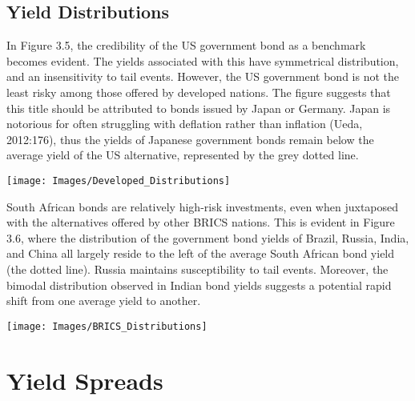 \documentclass[11pt,preprint, authoryear]{elsarticle}
\let\origfigure\figure
\let\endorigfigure\endfigure
\renewenvironment{figure}[1][2] {
    \expandafter\origfigure\expandafter[H]
} {
    \endorigfigure
}
\numberwithin{equation}{section}
\numberwithin{figure}{section}
\numberwithin{table}{section}
\begin{document}
\hypertarget{yield-distributions}{%
\subsection{Yield Distributions}\label{yield-distributions}}

In Figure 3.5, the credibility of the US government bond as a benchmark
becomes evident. The yields associated with this have symmetrical
distribution, and an insensitivity to tail events. However, the US
government bond is not the least risky among those offered by developed
nations. The figure suggests that this title should be attributed to
bonds issued by Japan or Germany. Japan is notorious for often
struggling with deflation rather than inflation (Ueda, 2012:176), thus
the yields of Japanese government bonds remain below the average yield
of the US alternative, represented by the grey dotted line.

\begin{figure}

{\centering \texttt{[image: Images/Developed\_Distributions]} 

}

\caption{Bond Yield Distributions of Developed Nations \label{Figure3.5}}\label{fig:unnamed-chunk-6}
\end{figure}

South African bonds are relatively high-risk investments, even when
juxtaposed with the alternatives offered by other BRICS nations. This is
evident in Figure 3.6, where the distribution of the government bond
yields of Brazil, Russia, India, and China all largely reside to the
left of the average South African bond yield (the dotted line). Russia
maintains susceptibility to tail events. Moreover, the bimodal
distribution observed in Indian bond yields suggests a potential rapid
shift from one average yield to another.

\begin{figure}

{\centering \texttt{[image: Images/BRICS\_Distributions]} 

}

\caption{Bond Yield Distributions of BRICS Nations \label{Figure3.6}}\label{fig:unnamed-chunk-7}
\end{figure}

\hypertarget{yield-spreads}{%
\section{Yield Spreads}\label{yield-spreads}}
\end{document}
